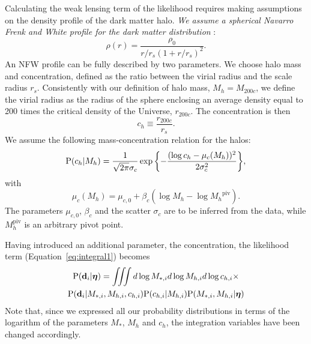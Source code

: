 \documentclass[usenatbib]{mnras}
\def\mstar{M_*}
\def\mstari{M_{*, i}}
\def\mhalo{M_{h}}
\def\mhaloi{M_{h, i}}
\def\chalo{c_{h}}
\def\chaloi{c_{h, i}}
\def\hyperp{\boldsymbol{\eta}}
\def\datai{\mathbf{d}_i}
\def\Eref#1{Equation~\ref{#1}\xspace}
\def\pr{{\rm P}}
\begin{document}
Calculating the weak lensing term of the likelihood requires making assumptions on the density profile of the dark matter halo. 
{\em We assume a spherical Navarro Frenk and White profile for the dark matter distribution} \citep[NFW,][]{NFW97}:
\begin{equation}\label{eq:nfw}
\rho(r) = \frac{\rho_0}{r/r_s(1 + r/r_s)^2}.
\end{equation}
An NFW profile can be fully described by two parameters. We choose halo mass and concentration, defined as the ratio between the virial radius and the scale radius $r_s$. Consistently with our definition of halo mass, $\mhalo = M_{200c}$, we define the virial radius as the radius of the sphere enclosing an average density equal to 200 times the critical density of the Universe, $r_{200c}$.
The concentration is then
\begin{equation}
\chalo \equiv \frac{r_{200c}}{r_s}.
\end{equation}
We assume the following mass-concentration relation for the halos:
\begin{equation}\label{eq:cmrel}
\pr(\chalo | \mhalo) = \frac{1}{\sqrt{2\pi}\sigma_c}\exp{\left\{-\frac{(\log{\chalo} - \mu_c(\mhalo))^2}{2\sigma_c^2}\right\}},
\end{equation}
with
\begin{equation}\label{eq:maccio}
\mu_c(\mhalo) = \mu_{c, 0} + \beta_c(\log{\mhalo} - \log{\mhalo}^{\mathrm{piv}}).
\end{equation}
The parameters $\mu_{c,0}$, $\beta_c$ and the scatter $\sigma_c$ are to be inferred from the data, while $\mhalo^{\mathrm{piv}}$ is an arbitrary pivot point.

Having introduced an additional parameter, the concentration, the likelihood term (\Eref{eq:integral1}) becomes
\begin{multline}\label{eq:integral2}
\pr(\datai | \hyperp) = \iiint d\log{\mstari} d\log{\mhaloi} d\log{\chaloi} \times \\
\pr(\datai | \mstari, \mhaloi, \chaloi) \pr(\chaloi | \mhaloi) \pr(\mstari, \mhaloi | \hyperp)
\end{multline}
%
Note that, since we expressed all our probability distributions in terms of the logarithm of the parameters $\mstar$, $\mhalo$ and $\chalo$, the integration variables have been changed accordingly.
\end{document}
